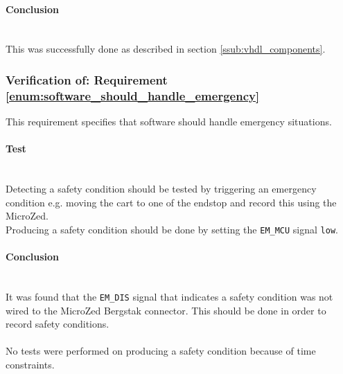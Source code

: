\paragraph{Conclusion}~\\
This was successfully done as described in section \ref{ssub:vhdl_components}. 

\subsubsection{Verification of: Requirement \ref{enum:software_should_handle_emergency}} %
\label{ssub:verification_of_requirement_enum:software_should_handle_emergency}
This requirement specifies that software should handle emergency situations.
\paragraph{Test}~\\
Detecting a safety condition should be tested by triggering an emergency condition e.g. moving the cart to one of the endstop and record this using the MicroZed.
\\
Producing a safety condition should be done by setting the \texttt{EM\_MCU} signal \texttt{low}. 

\paragraph{Conclusion}~\\
It was found that the \texttt{EM\_DIS} signal that indicates a safety condition was not wired to the MicroZed Bergstak connector.
This should be done in order to record safety conditions.
\\~\\
No tests were performed on producing a safety condition because of time constraints.